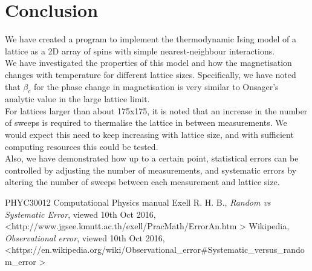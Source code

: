 \documentclass[a4paper]{article}
\begin{document}
\clearpage
\section{Conclusion}
We have created a program to implement the thermodynamic Ising model of a lattice as a 2D array of spins with simple nearest-neighbour interactions.\\

We have investigated the properties of this model and how the magnetisation changes with temperature for different lattice sizes. Specifically, we have noted that $\beta_c$ for the phase change in magnetisation is very similar to Onsager's analytic value in the large lattice limit.\\

For lattices larger than about 175x175, it is noted that an increase in the number of sweeps is required to thermalise the lattice in between measurements. We would expect this need to keep increasing with lattice size, and with sufficient computing resources this could be tested.\\

Also, we have demonstrated how up to a certain point, statistical errors can be controlled by adjusting the number of measurements, and systematic errors by altering the number of sweeps between each measurement and lattice size.

\begin{flushleft}
	\begin{thebibliography}{99}
			PHYC30012 Computational Physics manual
			Exell R. H. B., \emph{Random vs Systematic Error}, viewed 10th Oct 2016, \textless http://www.jgsee.kmutt.ac.th/exell/PracMath/ErrorAn.htm \textgreater
			Wikipedia, \emph{Observational error}, viewed 10th Oct 2016, \textless https://en.wikipedia.org/wiki/Observational\_error\#Systematic\_versus\_random\_error \textgreater
	\end{thebibliography}
\end{flushleft}
\end{document}

